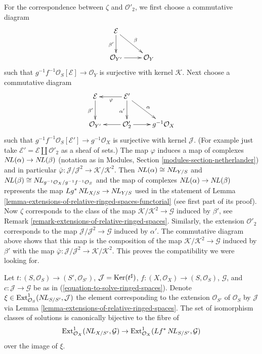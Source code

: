 \begin{remark}
For the correspondence between $\zeta$ and $\mathcal{O}'_2$,
we first choose a commutative diagram
$$
\xymatrix{
\mathcal{E} \ar[d]_{\beta'} \ar[rd]^\beta \\
\mathcal{O}_{Y'} \ar[r] & \mathcal{O}_Y
}
$$
such that $g^{-1}f^{-1}\mathcal{O}_S[\mathcal{E}] \to \mathcal{O}_Y$
is surjective with kernel $\mathcal{K}$. Next choose a
commutative diagram
$$
\xymatrix{
\mathcal{E} \ar[d]_{\beta'} &
\mathcal{E}' \ar[l]^\varphi \ar[d]_{\alpha'} \ar[rd]^\alpha \\
\mathcal{O}_{Y'} &
\mathcal{O}'_2 \ar[l] \ar[r] &
g^{-1}\mathcal{O}_X
}
$$
such that $g^{-1}f^{-1}\mathcal{O}_S[\mathcal{E}'] \to g^{-1}\mathcal{O}_X$
is surjective with kernel $\mathcal{J}$. (For example just take
$\mathcal{E}' = \mathcal{E} \amalg \mathcal{O}'_2$ as a sheaf of sets.)
The map $\varphi$ induces a map of complexes $\mathop{N\!L}\nolimits(\alpha) \to \mathop{N\!L}\nolimits(\beta)$
(notation as in Modules, Section \ref{modules-section-netherlander})
and in particular
$\bar\varphi : \mathcal{J}/\mathcal{J}^2 \to \mathcal{K}/\mathcal{K}^2$.
Then $\mathop{N\!L}\nolimits(\alpha) \cong \mathop{N\!L}\nolimits_{Y/S}$ and
$\mathop{N\!L}\nolimits(\beta) \cong \mathop{N\!L}\nolimits_{g^{-1}\mathcal{O}_X/g^{-1}f^{-1}\mathcal{O}_S}$
and the map of complexes $\mathop{N\!L}\nolimits(\alpha) \to \mathop{N\!L}\nolimits(\beta)$
represents the map $Lg^*\mathop{N\!L}\nolimits_{X/S} \to \mathop{N\!L}\nolimits_{Y/S}$ used in the
statement of Lemma \ref{lemma-extensions-of-relative-ringed-spaces-functorial}
(see first part of its proof). Now $\zeta$ corresponds to the
class of the map $\mathcal{K}/\mathcal{K}^2 \to \mathcal{G}$
induced by $\beta'$, see
Remark \ref{remark-extensions-of-relative-ringed-spaces}.
Similarly, the extension $\mathcal{O}'_2$ corresponds to the map
$\mathcal{J}/\mathcal{J}^2 \to \mathcal{G}$ induced by $\alpha'$.
The commutative diagram above shows that this map is
the composition of the map $\mathcal{K}/\mathcal{K}^2 \to \mathcal{G}$
induced by $\beta'$ with the map
$\bar\varphi : \mathcal{J}/\mathcal{J}^2 \to \mathcal{K}/\mathcal{K}^2$.
This proves the compatibility we were looking for.
\end{remark}

\begin{lemma}
\label{lemma-parametrize-solutions-ringed-spaces}
Let $t : (S, \mathcal{O}_S) \to (S', \mathcal{O}_{S'})$,
$\mathcal{J} = \mathop{\mathrm{Ker}}(t^\sharp)$,
$f : (X, \mathcal{O}_X) \to (S, \mathcal{O}_S)$, $\mathcal{G}$, and
$c : \mathcal{J} \to \mathcal{G}$ be as in
(\ref{equation-to-solve-ringed-spaces}).
Denote $\xi \in \mathop{\mathrm{Ext}}\nolimits^1_{\mathcal{O}_S}(\mathop{N\!L}\nolimits_{S/S'}, \mathcal{J})$
the element corresponding to the extension $\mathcal{O}_{S'}$
of $\mathcal{O}_S$ by $\mathcal{J}$ via
Lemma \ref{lemma-extensions-of-relative-ringed-spaces}.
The set of isomorphism classes of solutions is canonically bijective
to the fibre of
$$
\mathop{\mathrm{Ext}}\nolimits^1_{\mathcal{O}_X}(\mathop{N\!L}\nolimits_{X/S'}, \mathcal{G}) \to
\mathop{\mathrm{Ext}}\nolimits^1_{\mathcal{O}_X}(Lf^*\mathop{N\!L}\nolimits_{S/S'}, \mathcal{G})
$$
over the image of $\xi$.
\end{lemma}

